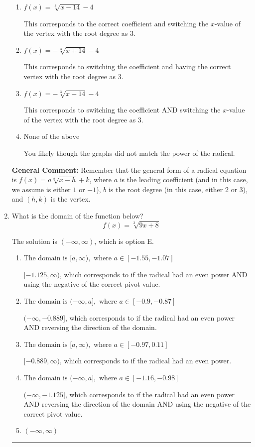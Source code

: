 \documentclass{extbook}[14pt]
\newcommand{\litem}[1]{\item #1

\rule{\textwidth}{0.4pt}}
\begin{document}
\begin{enumerate}
{\begin{enumerate}[label=\Alph*.]
* This is the correct option.
\item \( f(x) = \sqrt[3]{x - 14} - 4 \)

This corresponds to the correct coefficient and switching the $x$-value of the vertex with the root degree as $3$.
\item \( f(x) = - \sqrt[3]{x + 14} - 4 \)

This corresponds to switching the coefficient and having the correct vertex with the root degree as $3$.
\item \( f(x) = - \sqrt[3]{x - 14} - 4 \)

This corresponds to switching the coefficient AND switching the $x$-value of the vertex with the root degree as $3$.
\item \( \text{None of the above} \)

You likely though the graphs did not match the power of the radical.
\end{enumerate}

\textbf{General Comment:} Remember that the general form of a radical equation is $ f(x) = a \sqrt[b]{x - h} + k$, where $a$ is the leading coefficient (and in this case, we assume is either $1$ or $-1$), $b$ is the root degree (in this case, either $2$ or $3$), and $(h, k)$ is the vertex.
}
\litem{
What is the domain of the function below?
\[ f(x) = \sqrt[3]{9 x + 8} \]

The solution is \( (-\infty, \infty) \), which is option E.\begin{enumerate}[label=\Alph*.]
\item \( \text{The domain is } [a, \infty), \text{   where } a \in [-1.55, -1.07] \)

$[-1.125, \infty)$, which corresponds to if the radical had an even power AND using the negative of the correct pivot value.
\item \( \text{The domain is } (-\infty, a], \text{   where } a \in [-0.9, -0.87] \)

$(-\infty, -0.889]$, which corresponds to if the radical had an even power AND reversing the direction of the domain.
\item \( \text{The domain is } [a, \infty), \text{   where } a \in [-0.97, 0.11] \)

$[-0.889, \infty)$, which corresponds to if the radical had an even power.
\item \( \text{The domain is } (-\infty, a], \text{   where } a \in [-1.16, -0.98] \)

$(-\infty, -1.125]$, which corresponds to if the radical had an even power AND reversing the direction of the domain AND using the negative of the correct pivot value.
\item \( (-\infty, \infty) \)


\end{enumerate}}
\end{enumerate}
\end{document}
